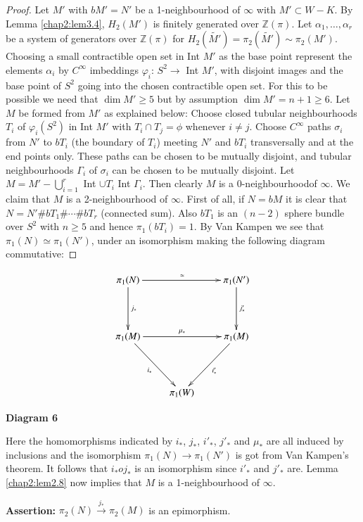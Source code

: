 \begin{proof}
Let $M'$ with $bM' = N'$ be a 1-neighbourhood of $ \infty$ with $M'
\subset W - K$. By Lemma \ref{chap2:lem3.4}, $H_2 (M')$ is finitely generated over $
\mathbb{Z} (\pi)$. Let $ \alpha_1, \ldots , \alpha_r $ be a system of
generators over $\mathbb{Z} (\pi)$ for $H_2 (\tilde{M'}) = \pi_2
(\tilde{M'}) \sim \pi_2 (M')$. Choosing a small contractible open set
in Int $M'$ as the base point represent the elements $\alpha_i$ by
$C^\infty$ imbeddings $\varphi_i$: $S^2 \rightarrow$ Int $M'$, with
disjoint images and the base point of $S^2$ going into the chosen
contractible open set. For this to be possible we need that $\dim M'
\geq 5$ but by assumption $\dim M' = n+1 \geq 6$. Let $M$ be formed
from $M'$ as explained below: Choose closed tubular neighbourhoods
$T_i$ of $\varphi_i (S^2)$ in Int $M'$ with $T_i \cap T_j = \phi$
whenever $i \neq j$. Choose $C^\infty$ paths $\sigma_i$ from $N'$ to
$b T_i$ (the boundary of $T_i$) meeting $N'$ and $bT_i$ transversally
and at the end points only. These paths can be chosen to be mutually
disjoint, and tubular neighbourhoods $\Gamma_i$ of $\sigma_i$ can be
chosen to be mutually disjoint. Let $M = M' - \bigcup\limits^r_{i =
  1}$ Int $\cup T_i$ Int $\Gamma_i$. Then clearly $M$ is a
0-neighbourhood\pageoriginale of $\infty$. We claim that $M$ is a
2-neighbourhood of $\infty$. First 
of all, if $N = bM$ it is clear that $N = N' \# bT_1 \# \cdots
\# bT_r$ (connected sum). Also $bT_1$ is an $(n-2)$ sphere bundle
over $S^2$ with $n\geq 5$ and hence $\pi_1 (bT_i) = 1$. By Van Kampen
we see that $ \pi_1 (N) \simeq \pi_1 (N')$, under an isomorphism
making the following diagram commutative: 
\end{proof}
\[
\xymatrix@R=1.5cm{
\pi_1 (N) \ar[rr]^{\simeq} \ar[d]^{j_*} & & \pi_1 (N')\ar[d]^{j'_*}
\\
\pi_1(M) \ar[rr]^{\mu_*}\ar[dr]_{i_*} & & \pi_1 (M)
\ar[dl]^{i'_*}\\
& \pi_1 (W)& 
}
\]
\begin{center}
{\bf Diagram 6}
\end{center}

 Here the homomorphisms indicated by $i_*$, $j _*$, $i'_*$, $j'_*$ and
 $\mu_{*}$ are all induced by inclusions and the isomorphism $\pi_1
 (N) \to \pi_1 (N')$ is got from Van Kampen's theorem. It follows that
 $i_{*} o  j_{*}$ is an isomorphism since $i'_*$ and $j'_* $
 are. Lemma \ref{chap2:lem2.8}  now implies that $M$ is a 1-neighbourhood of
 $\infty$. 

\noindent
\textbf{Assertion:} $\pi_2 (N) \xrightarrow{j_*}\pi_2 (M)$ is an
epimorphism. 
 
